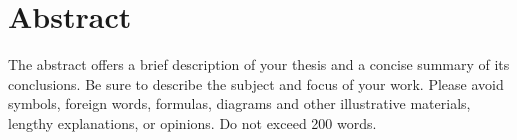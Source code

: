 


\chapter{Abstract}
\thispagestyle{empty}

The abstract offers a brief description of your thesis and a concise summary of its conclusions. Be sure to describe the subject and focus of your work. Please avoid symbols, foreign words, formulas, diagrams and other illustrative materials, lengthy explanations, or opinions. Do not exceed 200 words.
